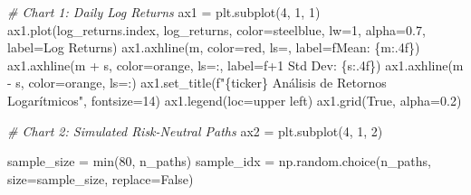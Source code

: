 \documentclass[
  11pt,
]{article}
\newenvironment{Shaded}{}{}
\newcommand{\BuiltInTok}[1]{\textcolor[rgb]{0.00,0.50,0.00}{#1}}
\newcommand{\CommentTok}[1]{\textcolor[rgb]{0.38,0.63,0.69}{\textit{#1}}}
\newcommand{\DecValTok}[1]{\textcolor[rgb]{0.25,0.63,0.44}{#1}}
\newcommand{\FloatTok}[1]{\textcolor[rgb]{0.25,0.63,0.44}{#1}}
\newcommand{\NormalTok}[1]{#1}
\newcommand{\OperatorTok}[1]{\textcolor[rgb]{0.40,0.40,0.40}{#1}}
\newcommand{\SpecialCharTok}[1]{\textcolor[rgb]{0.25,0.44,0.63}{#1}}
\newcommand{\SpecialStringTok}[1]{\textcolor[rgb]{0.73,0.40,0.53}{#1}}
\newcommand{\StringTok}[1]{\textcolor[rgb]{0.25,0.44,0.63}{#1}}
\newcommand{\VariableTok}[1]{\textcolor[rgb]{0.10,0.09,0.49}{#1}}
\begin{document}
\begin{Shaded}
\begin{Highlighting}[]
\CommentTok{\# Chart 1: Daily Log Returns}
\NormalTok{ax1 }\OperatorTok{=}\NormalTok{ plt.subplot(}\DecValTok{4}\NormalTok{, }\DecValTok{1}\NormalTok{, }\DecValTok{1}\NormalTok{)}
\NormalTok{ax1.plot(log\_returns.index, log\_returns, color}\OperatorTok{=}\StringTok{\textquotesingle{}steelblue\textquotesingle{}}\NormalTok{, lw}\OperatorTok{=}\DecValTok{1}\NormalTok{, alpha}\OperatorTok{=}\FloatTok{0.7}\NormalTok{, label}\OperatorTok{=}\StringTok{\textquotesingle{}Log Returns\textquotesingle{}}\NormalTok{)}
\NormalTok{ax1.axhline(m, color}\OperatorTok{=}\StringTok{\textquotesingle{}red\textquotesingle{}}\NormalTok{, ls}\OperatorTok{=}\StringTok{\textquotesingle{}{-}{-}\textquotesingle{}}\NormalTok{, label}\OperatorTok{=}\SpecialStringTok{f\textquotesingle{}Mean: }\SpecialCharTok{\{}\NormalTok{m}\SpecialCharTok{:.4f\}}\SpecialStringTok{\textquotesingle{}}\NormalTok{)}
\NormalTok{ax1.axhline(m }\OperatorTok{+}\NormalTok{ s, color}\OperatorTok{=}\StringTok{\textquotesingle{}orange\textquotesingle{}}\NormalTok{, ls}\OperatorTok{=}\StringTok{\textquotesingle{}:\textquotesingle{}}\NormalTok{, label}\OperatorTok{=}\SpecialStringTok{f\textquotesingle{}+1 Std Dev: }\SpecialCharTok{\{}\NormalTok{s}\SpecialCharTok{:.4f\}}\SpecialStringTok{\textquotesingle{}}\NormalTok{)}
\NormalTok{ax1.axhline(m }\OperatorTok{{-}}\NormalTok{ s, color}\OperatorTok{=}\StringTok{\textquotesingle{}orange\textquotesingle{}}\NormalTok{, ls}\OperatorTok{=}\StringTok{\textquotesingle{}:\textquotesingle{}}\NormalTok{)}
\NormalTok{ax1.set\_title(}\SpecialStringTok{f"}\SpecialCharTok{\{}\NormalTok{ticker}\SpecialCharTok{\}}\SpecialStringTok{ Análisis de Retornos Logarítmicos"}\NormalTok{, fontsize}\OperatorTok{=}\DecValTok{14}\NormalTok{)}
\NormalTok{ax1.legend(loc}\OperatorTok{=}\StringTok{\textquotesingle{}upper left\textquotesingle{}}\NormalTok{)}
\NormalTok{ax1.grid(}\VariableTok{True}\NormalTok{, alpha}\OperatorTok{=}\FloatTok{0.2}\NormalTok{)}

\CommentTok{\# Chart 2: Simulated Risk{-}Neutral Paths}
\NormalTok{ax2 }\OperatorTok{=}\NormalTok{ plt.subplot(}\DecValTok{4}\NormalTok{, }\DecValTok{1}\NormalTok{, }\DecValTok{2}\NormalTok{)}

\NormalTok{sample\_size }\OperatorTok{=} \BuiltInTok{min}\NormalTok{(}\DecValTok{80}\NormalTok{, n\_paths)}
\NormalTok{sample\_idx }\OperatorTok{=}\NormalTok{ np.random.choice(n\_paths, size}\OperatorTok{=}\NormalTok{sample\_size, replace}\OperatorTok{=}\VariableTok{False}\NormalTok{)}


\end{Highlighting}
\end{Shaded}
\end{document}
